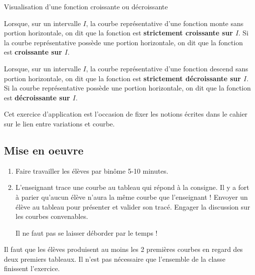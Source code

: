 \begin{DefT}{Visualisation d'une fonction croissante ou décroissante}
\begin{description}[leftmargin=*]
\item[•] Lorsque, sur un intervalle $I$, la courbe représentative d'une fonction monte sans portion horizontale, on dit que la fonction est \textbf{strictement croissante sur $I$}. Si la courbe représentative possède une portion horizontale, on dit que la fonction est \textbf{croissante sur $I$}.
\item[•] Lorsque, sur un intervalle $I$, la courbe représentative d'une fonction descend sans portion horizontale, on dit que la fonction est \textbf{strictement décroissante sur $I$}. Si la courbe représentative possède une portion horizontale, on dit que la fonction est \textbf{décroissante sur $I$}.
\end{description}
\end{DefT}



Cet exercice d'application est l'occasion de fixer les notions écrites dans le cahier sur le lien entre variations et courbe.


\subsection{Mise en oeuvre}

\begin{enumerate}
\item Faire travailler les élèves par binôme 5-10 minutes.
\item L'enseignant trace une courbe au tableau qui répond à la consigne. Il y a fort à parier qu'aucun élève n'aura la même courbe que l'enseignant ! Envoyer un élève au tableau pour présenter et valider son tracé. Engager la discussion sur les courbes convenables.
\begin{Rq}
Il ne faut pas se laisser déborder par le temps !
\end{Rq}
\end{enumerate}



Il faut que les élèves produisent au moins les 2 premières courbes en regard des deux premiers tableaux. Il n'est pas nécessaire que l'ensemble de la classe finissent l'exercice.

